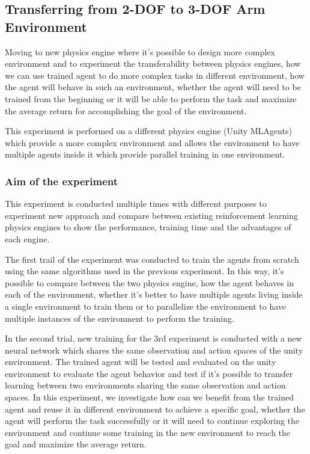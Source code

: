 
\subsection{Transferring from 2-DOF to 3-DOF Arm Environment}

Moving to new physics engine where it's possible to design more complex environment and to experiment the transferability between physics engines, how we can use trained agent to do more complex tasks in different environment, how the agent will behave in such an environment, whether the agent will need to be trained from the beginning or it will be able to perform the task and maximize the average return for accomplishing the goal of the environment.


This experiment is performed on a different physics engine (Unity MLAgents) which provide a more complex environment and allows the environment to have multiple agents inside it which provide parallel training in one environment.

\subsubsection{Aim of the experiment}

This experiment is conducted multiple times with different purposes to experiment new approach and compare between existing reinforcement learning physics engines to show the performance, training time and the advantages of each engine.

The first trail of the experiment was conducted to train the agents from scratch using the same algorithms used in the previous experiment. In this way, it's possible to compare between the two physics engine, how the agent behaves in each of the environment, whether it's better to have multiple agents living inside a single environment to train them or to parallelize the environment to have multiple instances of the environment to perform the training. 

In the second trial, new training for the 3rd experiment is conducted with a new neural network which shares the same observation and action spaces of the unity environment. The trained agent will be tested and evaluated on the unity environment to evaluate the agent behavior and test if it's possible to transfer learning between two environments sharing the same observation and action spaces. In this experiment, we investigate how can we benefit from the trained agent and reuse it in different environment to achieve a specific goal, whether the agent will perform the task successfully or it will need to continue exploring the environment and continue some training in the new environment to reach the goal and maximize the average return.

